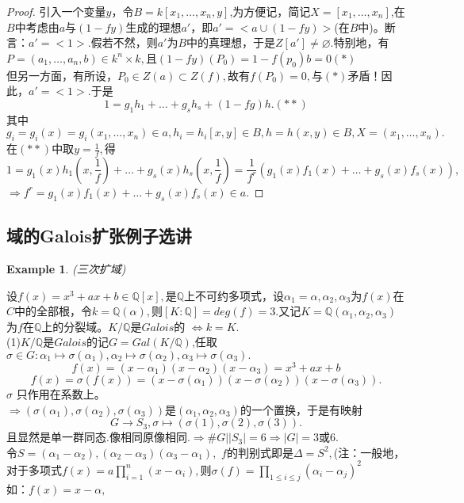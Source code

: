 \documentclass[UTF8]{article}
\newtheorem{exa}{Example}[section]
\begin{document}
\begin{proof}
	引入一个变量$y$，令$B=k[x_1,\ldots,x_n,y]$,为方便记，简记$X=[x_1,\ldots,x_n]$,在$B$中考虑由$a$与$(1-fy)$生成的理想$a'$，即$a'=<a\cup (1-fy)>$(在$B$中)。断言：$a'=<1>$.假若不然，则$a'$为$B$中的真理想，于是$Z[a']\neq \varnothing.$特别地，有$P=(a_1,\ldots,a_n,b)\in k^n\times k,$且$(1-fy)(P_0)=1-f(p_0)b=0(\ast)$\\
	但另一方面，有所设，$P_0\in Z(a)\subset Z(f),$故有$f(P_0)=0,$与$(\ast)$矛盾！因此，$a'=<1>.$于是
	$$1=g_1h_1+\ldots+g_sh_s+(1-fg)h.(\ast\ast)$$
	其中$g_i=g_i(x)=g_i(x_1,\ldots,x_n)\in a,h_i=h_i[x,y]\in B,h=h(x,y)\in B,X=(x_1,\ldots,x_n).$在$(\ast\ast)$中取$y=\frac{1}{f},$得
	$$1=g_1(x)h_1(x,\frac{1}{f})+\ldots+g_s(x)h_s(x,\frac{1}{f})=\frac{1}{f^r}(g_1(x)f_1(x)+\ldots+g_s(x)f_s(x)),$$
	$\Rightarrow f^r=g_1(x)f_1(x)+\ldots+g_s(x)f_s(x)\in a.$
\end{proof}
\subsection{域的Galois扩张例子选讲}
\begin{exa}
(三次扩域)
\end{exa}
设$f(x)=x^3+ax+b\in \mathbb{Q}[x],$是$\mathbb{Q}$上不可约多项式，设$\alpha_1=\alpha,\alpha_2,\alpha_3$为$f(x)$在$C$中的全部根，令$k=\mathbb{Q}(\alpha),$则$[K:\mathbb{Q}]=deg(f)=3.$又记$K=\mathbb{Q}(\alpha_1,\alpha_2,\alpha_3)$为$f$在$\mathbb{Q}$上的分裂域。$K/\mathbb{Q}$是$Galois$的
$\Leftrightarrow k=K.$\\
(1)$K/\mathbb{Q}$是$Galois$的记$G=Gal(K/\mathbb{Q})$,任取$\sigma\in G:\alpha_1\longmapsto \sigma(\alpha_1),\alpha_2\longmapsto \sigma(\alpha_2),\alpha_3\longmapsto \sigma(\alpha_3).$\\
$$
f(x)=(x-\alpha_1)(x-\alpha_2)(x-\alpha_3)=x^3+ax+b$$
$$f(x)=\sigma(f(x))=(x-\sigma(\alpha_1))(x-\sigma(\alpha_2))(x-\sigma(\alpha_3)).$$
$\sigma$ 只作用在系数上。\\
$\Rightarrow(\sigma(\alpha_1),\sigma(\alpha_2),\sigma(\alpha_3))$是$(\alpha_1,\alpha_2,\alpha_3)$的一个置换，于是有映射
$$G\longrightarrow S_3,\sigma\longmapsto(\sigma(1),\sigma(2),\sigma(3)).$$
且显然是单一群同态.像相同原像相同.$\Rightarrow \#G||S_3|=6\Rightarrow|G|=3$或6.\\
令$S=(\alpha_1-\alpha_2),(\alpha_2-\alpha_3)(\alpha_3-\alpha_1),$ $f$的判别式即是$\Delta=S^2,$(注：一般地，对于多项式$f(x)=a\prod\limits_{i=1}^n(x-\alpha_i),$则$\sigma(f)=\prod\limits_{1\leqslant i\leqslant j}(\alpha_i-\alpha_j)^2$\\
如：$f(x)=x-\alpha,$
\end{document}
